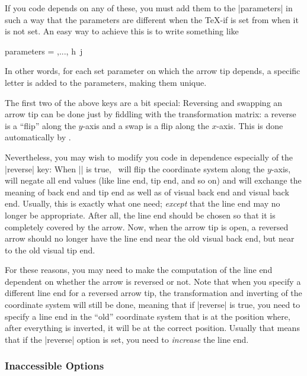 If you code depends on any of these, you must add them to the |parameters| in
such a way that the parameters are different when the \TeX-if is set from when
it is not set. An easy way to achieve this is to write something like
%
\begin{codeexample}
  parameters = { \the\pgfarrowlength,...,
                 \ifpgfarrowharpoon h\fi\
                 \ifpgfarrowroundjoin j\fi}
\end{codeexample}
%
In other words, for each set parameter on which the arrow tip depends, a
specific letter is added to the parameters, making them unique.

The first two of the above keys are a bit special: Reversing and swapping an
arrow tip can be done just by fiddling with the transformation matrix: a
reverse is a ``flip'' along the $y$-axis and a swap is a flip along the
$x$-axis. This is done automatically by \pgfname.

Nevertheless, you may wish to modify you code in dependence especially of the
|reverse| key: When |\ifpgfarrowreverse| is true, \pgfname\ will flip the
coordinate system along the $y$-axis, will negate all end values (like line
end, tip end, and so on) and will exchange the meaning of back end and tip end
as well as of visual back end and visual back end. Usually, this is exactly
what one need; \emph{except} that the line end may no longer be appropriate.
After all, the line end should be chosen so that it is completely covered by
the arrow. Now, when the arrow tip is open, a reversed arrow should no longer
have the line end near the old visual back end, but near to the old visual tip
end.

For these reasons, you may need to make the computation of the line end
dependent on whether the arrow is reversed or not. Note that when you specify a
different line end for a reversed arrow tip, the transformation and inverting
of the coordinate system will still be done, meaning that if |reverse| is true,
you need to specify a line end in the ``old'' coordinate system that is at the
position where, after everything is inverted, it will be at the correct
position. Usually that means that if the |reverse| option is set, you need to
\emph{increase} the line end.


\subsubsection{Inaccessible Options}

